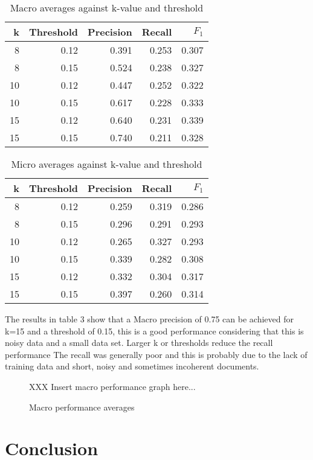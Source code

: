 \documentclass[twocolumn]{article}
\begin{document}
\begin{table}
\begin{tabular}{|r|r|r|r|r|}
\hline
k  & Threshold & Precision & Recall & $F_1$ \\ \hline
8  & 0.12 & 0.391 & 0.253 & 0.307 \\ \hline
8  & 0.15 & 0.524 & 0.238 & 0.327 \\ \hline
10 & 0.12 & 0.447 & 0.252 & 0.322 \\ \hline
10 & 0.15 & 0.617 & 0.228 & 0.333 \\ \hline
15 & 0.12 & 0.640 & 0.231 & 0.339 \\ \hline
15 & 0.15 & 0.740 & 0.211 & 0.328 \\ \hline
\end{tabular}
\caption{Macro averages against k-value and threshold}
\end{table}

\begin{table}
\begin{tabular}{|r|r|r|r|r|}
\hline
k  & Threshold & Precision & Recall & $F_1$ \\ \hline
8  & 0.12 & 0.259 & 0.319 & 0.286 \\ \hline
8  & 0.15 & 0.296 & 0.291 & 0.293 \\ \hline
10 & 0.12 & 0.265 & 0.327 & 0.293 \\ \hline
10 & 0.15 & 0.339 & 0.282 & 0.308 \\ \hline
15 & 0.12 & 0.332 & 0.304 & 0.317 \\ \hline
15 & 0.15 & 0.397 & 0.260 & 0.314 \\ \hline
\end{tabular}
\caption{Micro averages against k-value and threshold}
\end{table}


The results in table 3 show that a Macro precision of 0.75 can be achieved for k=15 
and a threshold of 0.15, this is a good performance considering that this is noisy data 
and a small data set. Larger k or thresholds reduce the recall performance The recall 
was generally poor and this is probably due to the lack of training data and short, 
noisy and sometimes incoherent documents.
 
\begin{figure}
XXX Insert macro performance graph here...
\caption{Macro performance averages}
\end{figure}
 

\section{Conclusion}
\end{document}
